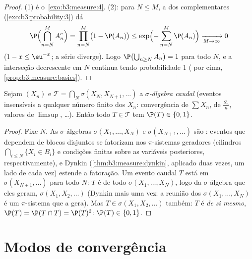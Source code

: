 \begin{proof}
(1) é o~\cref{exo:b3:measure:4}. (2): para $N \leq M$, a  dos
complementares (\cref{exo:b3:probability:3}) dá
\[
\P\Bigl(\bigcap_{n=N}^{M}A_n^c\Bigr) = \prod_{n=N}^M\bigl(1
- \P(A_n)\bigr) \leq
\exp\Bigl(-\sum_{n=N}^M\P(A_n)\Bigr) \xrightarrow[M \to
\infty]{} 0
\]
($1 - x \leq \eu^{-x}$; a série diverge). Logo $\P\bigl(\bigcup_{n\geq N}A_n\bigr) = 1$ para todo $N$, e a interseção
decrescente em $N$ continua tendo probabilidade $1$ (
por cima, \cref{prop:b3:measure:basics}).
\end{proof}

\begin{theorem}
\label{thm:b3:probability:zeroone}
Sejam $(X_n)$  e $\mathcal T =
\bigcap_N\sigma(X_N, X_{N+1}, \dots)$ a \emph{$\sigma$-álgebra
caudal} (eventos insensíveis a
qualquer número finito dos $X_n$: convergência de $\sum X_n$, de $\frac{S_n}n$,
valores de $\limsup$, \dots). Então todo $T \in \mathcal T$ tem $\P(T) \in \{0,
1\}$.
\end{theorem}

\begin{proof}
Fixe $N$. As $\sigma$-álgebras $\sigma(X_1, \dots, X_N)$ e $\sigma(X_{N+1}, \dots)$ são :
eventos que dependem de blocos disjuntos se fatorizam nos
$\pi$-sistemas geradores (cilindros $\bigcap_{i\leq N}\{X_i \in B_i\}$ e condições finitas sobre
as variáveis posteriores, respectivamente), e Dynkin
(\cref{thm:b3:measure:dynkin}, aplicado duas vezes, um lado de cada vez) estende a
fatoração. Um evento caudal $T$ está em $\sigma(X_{N+1}, \dots)$ para todo $N$:
$T$ é  de todo $\sigma(X_1, \dots, X_N)$, logo da $\sigma$-álgebra que
eles geram, $\sigma(X_1, X_2, \dots)$ (Dynkin mais uma vez: a reunião dos $\sigma(X_1,\dots,X_N)$ é um
$\pi$-sistema que a gera). Mas $T \in \sigma(X_1, X_2, \dots)$ também: $T$ é 
\emph{de si mesmo}, $\P(T) = \P(T\cap T) =
\P(T)^2$: $\P(T) \in \{0, 1\}$.
\end{proof}

\section{Modos de convergência}


